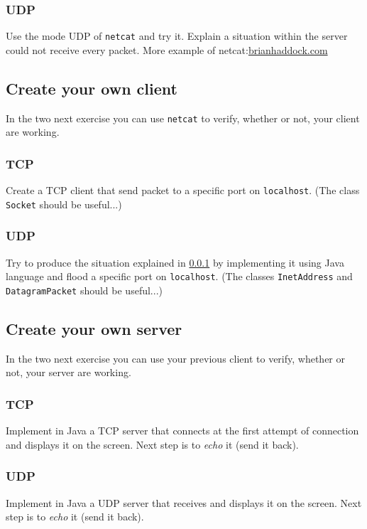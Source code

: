 \documentclass[11pt]{article}
\begin{document}
\subsubsection{UDP}\label{chat:udp}
Use the mode UDP of \verb"netcat" and try it. Explain a situation within the server could not receive every packet.
\newline
More example of netcat:\color{blue}\href{http://www.brianhaddock.com/2013/8-great-netcat-nc-unix-commands}{brianhaddock.com}\color{black}

\subsection{Create your own client}
In the two next exercise you can use \verb"netcat" to verify, whether or not, your client are working.
\subsubsection{TCP}
Create a TCP client that send packet to a specific port on \verb"localhost". (The class \verb"Socket" should be useful...)
\subsubsection{UDP}
Try to produce the situation explained in \ref{chat:udp} by implementing it using Java language and flood a specific port on \verb"localhost". (The classes \verb"InetAddress" and \verb"DatagramPacket" should be useful...)

\subsection{Create your own server}
In the two next exercise you can use your previous client to verify, whether or not, your server are working.
\subsubsection{TCP}
Implement in Java a TCP server that connects at the first attempt of connection and displays it on the screen. Next step is to \emph{echo} it (send it back).
\subsubsection{UDP}
Implement in Java a UDP server that receives and displays it on the screen. Next step is to \emph{echo} it (send it back).
\end{document}
